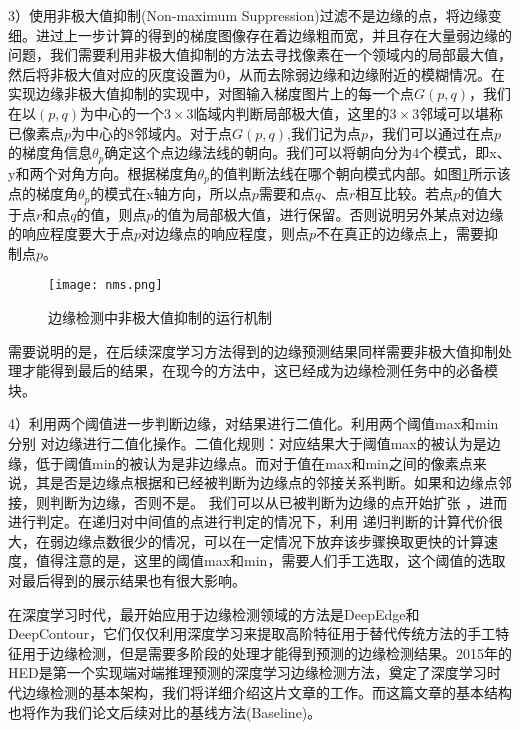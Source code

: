\documentclass[master]{thesis-uestc}
\begin{document}
3）使用非极大值抑制(Non-maximum Suppression)过滤不是边缘的点，将边缘变细。进过上一步计算的得到的梯度图像存在着边缘粗而宽，并且存在大量弱边缘的问题，我们需要利用非极大值抑制的方法去寻找像素在一个领域内的局部最大值，然后将非极大值对应的灰度设置为0，从而去除弱边缘和边缘附近的模糊情况。在实现边缘非极大值抑制的实现中，对图输入梯度图片上的每一个点$G(p, q)$，我们在以$(p, q)$为中心的一个$3 \times 3$临域内判断局部极大值，这里的$3 \times 3$邻域可以堪称已像素点$p$为中心的8邻域内。对于点$G(p, q)$,我们记为点$p$，我们可以通过在点$p$的梯度角信息$\theta_p$确定这个点边缘法线的朝向。我们可以将朝向分为4个模式，即x、y和两个对角方向。根据梯度角$\theta_p$的值判断法线在哪个朝向模式内部。如图\ref{nms}所示该点的梯度角$\theta_p$的模式在x轴方向，所以点$p$需要和点$q$、点$r$相互比较。若点$p$的值大于点$r$和点$q$的值，则点$p$的值为局部极大值，进行保留。否则说明另外某点对边缘的响应程度要大于点$p$对边缘点的响应程度，则点$p$不在真正的边缘点上，需要抑制点$p$。
\begin{figure}[h!]
    \centering
    \texttt{[image: nms.png]}
    \caption{边缘检测中非极大值抑制的运行机制}
    \label{nms}
\end{figure}
需要说明的是，在后续深度学习方法得到的边缘预测结果同样需要非极大值抑制处理才能得到最后的结果，在现今的方法中，这已经成为边缘检测任务中的必备模块。

4）利用两个阈值进一步判断边缘，对结果进行二值化。利用两个阈值max和min分别 对边缘进行二值化操作。二值化规则：对应结果大于阈值max的被认为是边缘，低于阈值min的被认为是非边缘点。而对于值在max和min之间的像素点来说，其是否是边缘点根据和已经被判断为边缘点的邻接关系判断。如果和边缘点邻接，则判断为边缘，否则不是。 我们可以从已被判断为边缘的点开始扩张 ，进而进行判定。在递归对中间值的点进行判定的情况下，利用 递归判断的计算代价很大，在弱边缘点数很少的情况，可以在一定情况下放弃该步骤换取更快的计算速度，值得注意的是，这里的阈值max和min，需要人们手工选取，这个阈值的选取对最后得到的展示结果也有很大影响。


在深度学习时代，最开始应用于边缘检测领域的方法是DeepEdge和DeepContour，它们仅仅利用深度学习来提取高阶特征用于替代传统方法的手工特征用于边缘检测，但是需要多阶段的处理才能得到预测的边缘检测结果。2015年的HED是第一个实现端对端推理预测的深度学习边缘检测方法，奠定了深度学习时代边缘检测的基本架构，我们将详细介绍这片文章的工作。而这篇文章的基本结构也将作为我们论文后续对比的基线方法(Baseline)。
\end{document}
